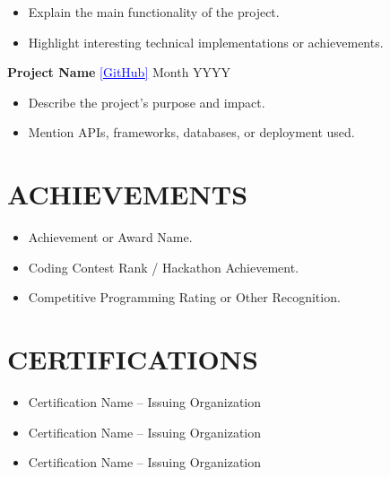 \documentclass[10pt,a4paper]{article}
\begin{document}
\begin{itemize}[leftmargin=0.2in,itemsep=2pt]

\item Explain the main functionality of the project.

\item Highlight interesting technical implementations or achievements.

\end{itemize}

\vspace{4pt}

\textbf{Project Name}
\href{https://github.com/yourusername/project}
{\textcolor{blue}{[\underline{GitHub}]}}
\hfill Month YYYY

\begin{itemize}[leftmargin=0.2in,itemsep=2pt]

\item Describe the project's purpose and impact.

\item Mention APIs, frameworks, databases, or deployment used.

\end{itemize}

\section*{ACHIEVEMENTS}

\begin{itemize}[leftmargin=0.2in,itemsep=2pt]

\item Achievement or Award Name.

\item Coding Contest Rank / Hackathon Achievement.

\item Competitive Programming Rating or Other Recognition.

\end{itemize}

\section*{CERTIFICATIONS}

\begin{itemize}[leftmargin=0.2in,itemsep=2pt]

\item Certification Name -- Issuing Organization

\item Certification Name -- Issuing Organization

\item Certification Name -- Issuing Organization

\end{itemize}
\end{document}
